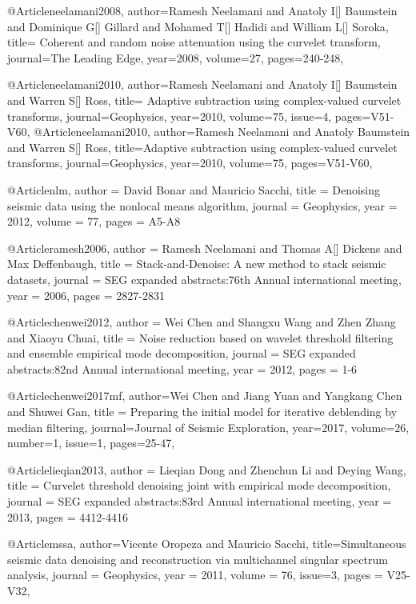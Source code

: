 @Article{neelamani2008,
  author={Ramesh Neelamani and Anatoly I[] Baumstein and Dominique G[] Gillard and Mohamed T[] Hadidi and William L[] Soroka},
  title={	
Coherent and random noise attenuation using the curvelet transform},
  journal={The Leading Edge},
  year=2008,
  volume=27,
  pages={240-248},
}


@Article{neelamani2010,
  author={Ramesh Neelamani and Anatoly I[] Baumstein and Warren S[] Ross},
  title={		
Adaptive subtraction using complex-valued curvelet transforms},
  journal={Geophysics},
  year=2010,
  volume=75,
  issue=4,
  pages={V51-V60},
}
@Article{neelamani2010,
  author={Ramesh Neelamani and Anatoly Baumstein and Warren S[] Ross},
  title={Adaptive subtraction using complex-valued curvelet transforms},
  journal={Geophysics},
  year=2010,
  volume=75,
  pages={V51-V60},
}


@Article{nlm,
  author = 	 {David Bonar and Mauricio Sacchi},
  title = 	 {Denoising seismic data using the nonlocal means algorithm},
  journal = 	 {Geophysics},
  year = 	 2012,
  volume =	 77,
  pages =	 {A5-A8}
}

@Article{ramesh2006,
  author = 	 {Ramesh Neelamani and Thomas A[] Dickens and Max Deffenbaugh},
  title = 	 {	
Stack‐and‐Denoise: A new method to stack seismic datasets},
  journal = 	 {SEG expanded abstracts:76th Annual international meeting},
  year = 	 2006,
  pages =	 {2827-2831}
}

@Article{chenwei2012,
  author = 	 {Wei Chen and Shangxu Wang and Zhen Zhang and Xiaoyu Chuai},
  title = 	 {Noise reduction based on wavelet threshold filtering and ensemble empirical mode decomposition},
  journal = 	 {SEG expanded abstracts:82nd Annual international meeting},
  year = 	 2012,
  pages =	 {1-6}
}

@Article{chenwei2017mf,
  author={Wei Chen and Jiang Yuan and Yangkang Chen and Shuwei Gan},
  title = {Preparing the initial model for iterative deblending by median filtering},
  journal={Journal of Seismic Exploration},
  year=2017,
  volume=26,
  number=1,
  issue=1,
  pages={25-47},
}

@Article{lieqian2013,
  author = 	 {Lieqian Dong and Zhenchun Li and Deying Wang},
  title = 	 {Curvelet threshold denoising joint with empirical mode decomposition},
  journal = 	 {SEG expanded abstracts:83rd Annual international meeting},
  year = 	 2013,
  pages =	 {4412-4416}
}



@Article{mssa,
  author={Vicente Oropeza and Mauricio Sacchi},
  title={Simultaneous seismic data denoising and reconstruction via multichannel singular spectrum analysis},
  journal = 	 {Geophysics},
  year = 	 2011,
  volume =	 76,
    issue=3,
  pages =	 {V25-V32},
}


